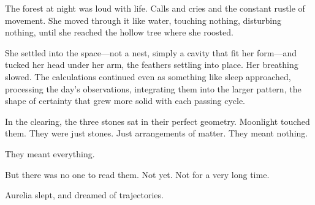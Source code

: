 The forest at night was loud with life. Calls and cries and the constant rustle of movement. She moved through it like water, touching nothing, disturbing nothing, until she reached the hollow tree where she roosted.

She settled into the space—not a nest, simply a cavity that fit her form—and tucked her head under her arm, the feathers settling into place. Her breathing slowed. The calculations continued even as something like sleep approached, processing the day's observations, integrating them into the larger pattern, the shape of certainty that grew more solid with each passing cycle.

In the clearing, the three stones sat in their perfect geometry. Moonlight touched them. They were just stones. Just arrangements of matter. They meant nothing.

They meant everything.

But there was no one to read them. Not yet. Not for a very long time.

Aurelia slept, and dreamed of trajectories.

